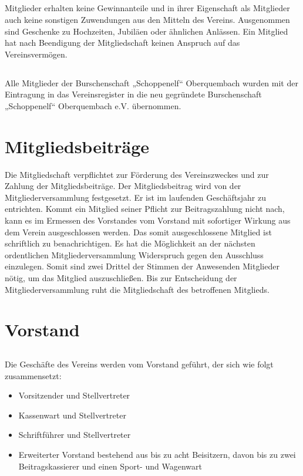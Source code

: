 	\subsection{} Mitglieder erhalten keine Gewinnanteile und in ihrer Eigenschaft als Mitglieder auch keine sonstigen Zuwendungen aus den Mitteln des Vereins. Ausgenommen sind Geschenke zu Hochzeiten, Jubiläen oder ähnlichen Anlässen. Ein Mitglied hat nach Beendigung der Mitgliedschaft keinen Anspruch auf das Vereinsvermögen. 
	
	\subsection{} Alle Mitglieder der Burschenschaft „Schoppenelf“ Oberquembach wurden mit der Eintragung in das Vereinsregister in die neu gegründete Burschenschaft „Schoppenelf“ Oberquembach e.V. übernommen.

\section{Mitgliedsbeiträge}	\label{8}
Die Mitgliedschaft verpflichtet zur Förderung des Vereinszweckes und zur Zahlung der Mitgliedsbeiträge. Der Mitgliedsbeitrag wird von der Mitgliederversammlung festgesetzt.
Er ist im laufenden Geschäftsjahr zu entrichten. Kommt ein Mitglied seiner Pflicht zur Beitragszahlung nicht nach, kann es im Ermessen des Vorstandes vom Vorstand mit sofortiger Wirkung aus dem Verein ausgeschlossen werden. Das somit ausgeschlossene Mitglied ist schriftlich zu benachrichtigen. Es hat die Möglichkeit an der nächsten ordentlichen Mitgliederversammlung Widerspruch gegen den Ausschluss einzulegen. Somit sind zwei Drittel der Stimmen der Anwesenden Mitglieder nötig, um das Mitglied auszuschließen. Bis zur Entscheidung der Mitgliederversammlung ruht die Mitgliedschaft des betroffenen Mitglieds. 

\section{Vorstand}
	\subsection {} Die Geschäfte des Vereins werden vom Vorstand geführt, der sich wie folgt zusammensetzt:
	\begin{itemize}
		\item Vorsitzender und Stellvertreter
		\item Kassenwart und Stellvertreter
		\item Schriftführer und Stellvertreter
		\item Erweiterter Vorstand bestehend aus bis zu acht Beisitzern, davon bis zu zwei Beitragskassierer und einen Sport- und Wagenwart
	\end{itemize} 
	
